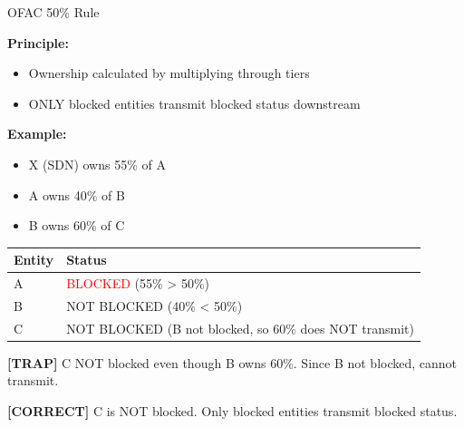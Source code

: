 \documentclass[8pt,aspectratio=169,fontsize=7pt]{beamer}
\renewcommand{\tiny}{\fontsize{4pt}{5pt}\selectfont}
\renewcommand{\normalsize}{\fontsize{8pt}{9pt}\selectfont}
\newcommand{\trap}[1]{%
	\begin{block}{\textcolor{redtrap}{\textbf{[TRAP]}}}
		\textcolor{redtrap}{\tiny #1}
	\end{block}
}
\newcommand{\correct}[1]{%
	\begin{block}{\textcolor{greencorrect}{\textbf{[CORRECT]}}}
		\textcolor{greencorrect}{\tiny #1}
	\end{block}
}
\begin{document}
	\begin{frame}{\normalsize OFAC 50\% Rule}
		
		\textbf{Principle:}
		\begin{itemize}
			\item Ownership calculated by multiplying through tiers
			\item ONLY blocked entities transmit blocked status downstream
		\end{itemize}
		
		\textbf{Example:}
		\begin{itemize}
			\item X (SDN) owns 55\% of A
			\item A owns 40\% of B
			\item B owns 60\% of C
		\end{itemize}
		
		\begin{table}
			\begin{tabular}{|p{2.5cm}|p{5cm}|}
				\hline
				\textbf{Entity} & \textbf{Status} \\
				\hline
				A & \textcolor{red}{BLOCKED} (55\% > 50\%) \\
				\hline
				B & NOT BLOCKED (40\% < 50\%) \\
				\hline
				C & NOT BLOCKED (B not blocked, so 60\% does NOT transmit) \\
				\hline
			\end{tabular}
		\end{table}
		
		\trap{C NOT blocked even though B owns 60\%. Since B not blocked, cannot transmit.}
		
		\correct{C is NOT blocked. Only blocked entities transmit blocked status.}
	\end{frame}
	
\end{document}
